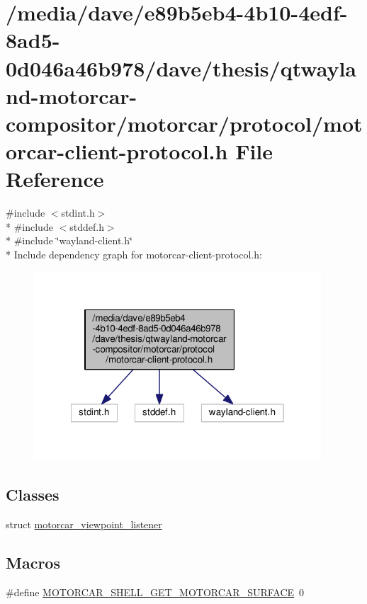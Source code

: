 \hypertarget{protocol_2motorcar-client-protocol_8h}{\section{/media/dave/e89b5eb4-\/4b10-\/4edf-\/8ad5-\/0d046a46b978/dave/thesis/qtwayland-\/motorcar-\/compositor/motorcar/protocol/motorcar-\/client-\/protocol.h File Reference}
\label{protocol_2motorcar-client-protocol_8h}
}
{\ttfamily \#include $<$stdint.\-h$>$}\\*
{\ttfamily \#include $<$stddef.\-h$>$}\\*
{\ttfamily \#include \char`\"{}wayland-\/client.\-h\char`\"{}}\\*
Include dependency graph for motorcar-\/client-\/protocol.h\-:\nopagebreak
\begin{figure}[H]
\begin{center}
\leavevmode
\includegraphics[width=304pt]{protocol_2motorcar-client-protocol_8h__incl}
\end{center}
\end{figure}
\subsection*{Classes}
\begin{DoxyCompactItemize}
\item 
struct \hyperlink{structmotorcar__viewpoint__listener}{motorcar\-\_\-viewpoint\-\_\-listener}
\end{DoxyCompactItemize}
\subsection*{Macros}
\begin{DoxyCompactItemize}
\item 
\#define \hyperlink{protocol_2motorcar-client-protocol_8h_a99bdc7c0bb1a6088577cfe9c263b33a4}{M\-O\-T\-O\-R\-C\-A\-R\-\_\-\-S\-H\-E\-L\-L\-\_\-\-G\-E\-T\-\_\-\-M\-O\-T\-O\-R\-C\-A\-R\-\_\-\-S\-U\-R\-F\-A\-C\-E}~0
\end{DoxyCompactItemize}
